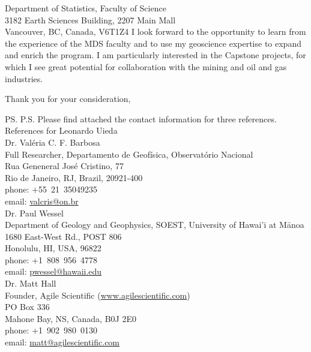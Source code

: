 \documentclass[11pt]{letter}
\begin{document}
\begin{letter}{
    Department of Statistics, Faculty of Science
    \\
    3182 Earth Sciences Building, 2207 Main Mall
    \\
    Vancouver, BC, Canada, V6T1Z4
}
I look forward to the opportunity to learn from the experience of the MDS
faculty and to use my geoscience expertise to expand and enrich the program.
I am particularly interested in the Capstone projects, for which I see great
potential for collaboration with the mining and oil and gas industries.

\closing{Thank you for your consideration,}

\ps
\vspace{1cm}
P.S. Please find attached the contact information for three references.
\newpage
{\fontsize{16pt}{0}\selectfont References for Leonardo Uieda}
\\[1cm]
Dr. Valéria C. F. Barbosa
\\
Full Researcher, Departamento de Geofísica, Observatório Nacional
\\
Rua Geneneral José Cristino, 77
\\
Rio de Janeiro, RJ, Brazil, 20921-400
\\
phone: +55~21~35049235
\\
email: \href{mailto:valcris@on.br}{valcris@on.br}
\\[0.5cm]
Dr. Paul Wessel
\\
Department of Geology and Geophysics, SOEST, University of Hawai'i at M\={a}noa
\\
1680 East-West Rd., POST 806
\\
Honolulu, HI, USA, 96822
\\
phone: +1~808~956~4778
\\
email: \href{mailto:pwessel@hawaii.edu}{pwessel@hawaii.edu}
\\[0.5cm]
Dr. Matt Hall
\\
Founder, Agile Scientific
(\href{https://agilescientific.com}{www.agilescientific.com})
\\
PO Box 336
\\
Mahone Bay, NS, Canada, B0J 2E0
\\
phone: +1~902~980~0130
\\
email: \href{mailto:matt@agilescientific.com}{matt@agilescientific.com}

\end{letter}
\end{document}

